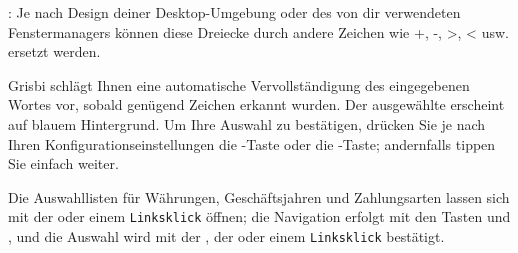 \Note{}: Je nach Design deiner Desktop-Umgebung oder des von dir verwendeten Fenstermanagers können diese Dreiecke durch andere Zeichen wie +, -, >, < usw. ersetzt werden.

Grisbi schlägt Ihnen eine automatische Vervollständigung des eingegebenen Wortes vor, sobald genügend Zeichen erkannt wurden. Der ausgewählte  erscheint auf {\setlength{\fboxsep}{2pt}\colorbox[RGB]{61,174,233}{blauem Hintergrund}}. Um Ihre Auswahl zu bestätigen, drücken Sie je nach Ihren Konfigurationseinstellungen die \keys{\tab}-Taste oder die -Taste; andernfalls tippen Sie einfach weiter.

Die Auswahllisten für Währungen, Geschäftsjahren und Zahlungsarten lassen sich mit der  oder einem \texttt{Linksklick} öffnen; die Navigation erfolgt mit den Tasten \keys{\arrowkeyup} und \keys{\arrowkeydown}, und die Auswahl wird mit der , der  oder einem \texttt{Linksklick} bestätigt.


